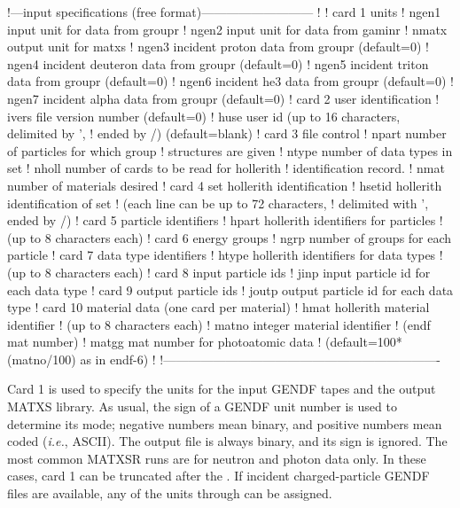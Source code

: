 \small
\begin{ccode}

   !---input specifications (free format)---------------------------
   !
   ! card 1 units
   !   ngen1     input unit for data from groupr
   !   ngen2     input unit for data from gaminr
   !   nmatx     output unit for matxs
   !   ngen3     incident proton data from groupr (default=0)
   !   ngen4     incident deuteron data from groupr (default=0)
   !   ngen5     incident triton data from groupr (default=0)
   !   ngen6     incident he3 data from groupr (default=0)
   !   ngen7     incident alpha data from groupr (default=0)
   ! card 2 user identification
   !   ivers     file version number (default=0)
   !   huse      user id (up to 16 characters, delimited by ',
   !             ended by /) (default=blank)
   ! card 3 file control
   !   npart     number of particles for which group
   !                structures are given
   !   ntype     number of data types in set
   !   nholl     number of cards to be read for hollerith
   !             identification record.
   !   nmat      number of materials desired
   ! card 4 set hollerith identification
   !   hsetid    hollerith identification of set
   !             (each line can be up to 72 characters,
   !             delimited with ', ended by /)
   ! card 5 particle identifiers
   !   hpart     hollerith identifiers for particles
   !             (up to 8 characters each)
   ! card 6 energy groups
   !   ngrp      number of groups for each particle
   ! card 7 data type identifiers
   !   htype     hollerith identifiers for data types
   !             (up to 8 characters each)
   ! card 8 input particle ids
   !   jinp     input particle id for each data type
   ! card 9 output particle ids
   !   joutp    output particle id for each data type
   ! card 10 material data (one card per material)
   !   hmat      hollerith material identifier
   !             (up to 8 characters each)
   !   matno     integer material identifier
   !             (endf mat number)
   !   matgg     mat number for photoatomic data
   !             (default=100*(matno/100) as in endf-6)
   !
   !-------------------------------------------------------------------

\end{ccode}
\normalsize

Card 1 is used to specify the units for the input GENDF tapes
and the output MATXS library.  As usual, the sign of a GENDF unit
number is used to determine its mode; negative numbers mean
binary, and positive numbers mean coded ({\it i.e.}, ASCII).
The output file is always binary, and its sign is ignored.
The most common MATXSR
runs are for neutron and photon data only.
In these cases, card 1 can be truncated after the .
If incident charged-particle GENDF files are available, any of
the units  through  can be assigned.

